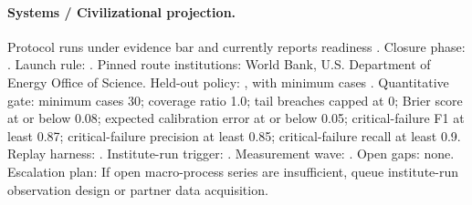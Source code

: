 \paragraph{Systems / Civilizational projection.}
Protocol  runs under evidence bar  and currently reports readiness .
Closure phase: . Launch rule: .
Pinned route institutions: World Bank, \allowbreak U.S. Department of Energy Office of Science.
Held-out policy: , with minimum cases .
Quantitative gate: minimum cases 30; coverage ratio 1.0; tail breaches capped at 0; Brier score at or below 0.08; expected calibration error at or below 0.05; critical-failure F1 at least 0.87; critical-failure precision at least 0.85; critical-failure recall at least 0.9.
Replay harness: .
Institute-run trigger: . Measurement wave: .
Open gaps: none.
Escalation plan: If open macro-process series are insufficient, queue institute-run observation design or partner data acquisition.
